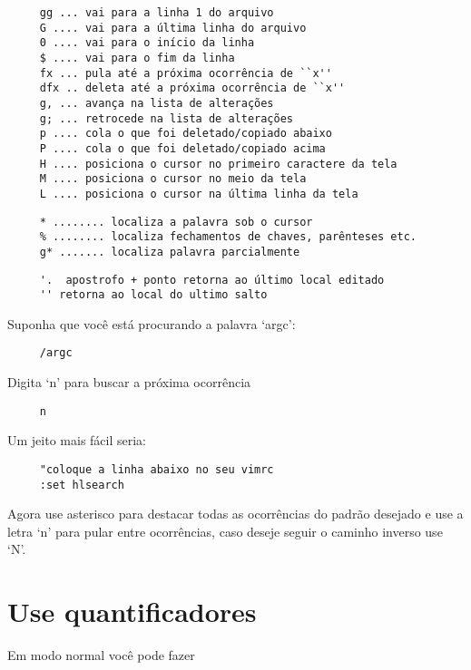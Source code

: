\begin{verbatim}
     gg ... vai para a linha 1 do arquivo
     G .... vai para a última linha do arquivo
     0 .... vai para o início da linha
     $ .... vai para o fim da linha
     fx ... pula até a próxima ocorrência de ``x''
     dfx .. deleta até a próxima ocorrência de ``x''
     g, ... avança na lista de alterações
     g; ... retrocede na lista de alterações
     p .... cola o que foi deletado/copiado abaixo
     P .... cola o que foi deletado/copiado acima
     H .... posiciona o cursor no primeiro caractere da tela
     M .... posiciona o cursor no meio da tela
     L .... posiciona o cursor na última linha da tela
\end{verbatim}

\begin{verbatim}
     * ........ localiza a palavra sob o cursor
     % ........ localiza fechamentos de chaves, parênteses etc.
     g* ....... localiza palavra parcialmente
\end{verbatim}

\begin{verbatim}
     '.  apostrofo + ponto retorna ao último local editado
     '' retorna ao local do ultimo salto
\end{verbatim}

Suponha que você está procurando a palavra `argc':

\begin{verbatim}
     /argc
\end{verbatim}

Digita `n' para buscar a próxima ocorrência

\begin{verbatim}
     n
\end{verbatim}

Um jeito mais fácil seria:

\begin{verbatim}
     "coloque a linha abaixo no seu vimrc
     :set hlsearch
\end{verbatim}

Agora use asterisco para destacar todas as ocorrências do padrão desejado
e use a letra `n' para pular entre ocorrências, caso deseje seguir o caminho
inverso use `N'.

\section{Use quantificadores}
\label{Use quantificadores}
Em modo normal você pode fazer

